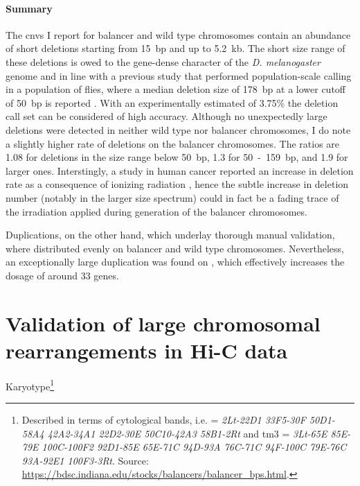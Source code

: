 \paragraph{Summary} The \acp{cnv} I report for balancer and wild type
chromosomes contain an abundance of short deletions starting from 15~bp and up
to 5.2~kb. The short size range of these deletions is owed to the gene-dense
character of the \textit{D. melanogaster} genome and in line with a previous
study that performed population-scale \sv calling in a population of flies,
where a median deletion size of 178~bp at a lower cutoff of 50~bp is reported
\citep{Zichner2013}.
With an experimentally estimated \fdr of 3.75\% the deletion call set can be
considered of high accuracy. Although no unexpectedly large deletions were
detected in neither wild type nor balancer chromosomes, I do note a slightly
higher rate of deletions on the balancer chromosomes. The ratios are 1.08 for
deletions in the size range below 50~bp, 1.3 for 50~-~159~bp, and 1.9 for larger
ones. Interstingly, a study in human cancer reported an increase in deletion
rate as a consequence of ionizing radiation \citep{Behjati2016}, hence the
subtle increase in deletion number (notably in the larger size spectrum) could
in fact be a fading trace of the irradiation applied during generation of the
balancer chromosomes.

Duplications, on the other hand, which underlay thorough manual validation,
where distributed evenly on balancer and wild type chromosomes. Nevertheless,
an exceptionally large duplication was found on \cyo, which effectively
increases the dosage of around 33 genes.






\section{Validation of large chromosomal rearrangements in Hi-C data}
\label{sec:balancer_hic_svs}

Karyotype\footnote{\label{footnote:balancer_karyotype}
    Described in terms of cytological bands, i.e. \cyo = \textit{2Lt-22D1
    33F5-30F 50D1-58A4 42A2-34A1 22D2-30E 50C10-42A3 58B1-2Rt} and
    \ac{tm3} = \textit{3Lt-65E 85E-79E 100C-100F2 92D1-85E 65E-71C
    94D-93A 76C-71C 94F-100C 79E-76C 93A-92E1 100F3-3Rt}.
    Source: \url{https://bdsc.indiana.edu/stocks/balancers/balancer_bps.html}.}

